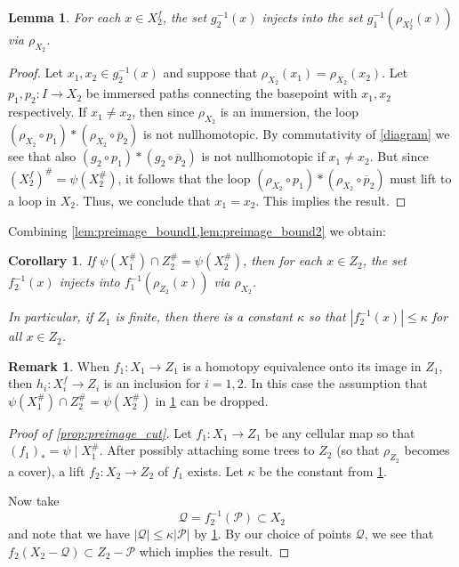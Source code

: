 \documentclass[11pt, a4paper]{amsart}
\newtheorem{lemma}[theorem]{Lemma}
\newtheorem{corollary}[theorem]{Corollary}
\theoremstyle{definition}
\newtheorem{remark}[theorem]{Remark}
\begin{document}
\begin{lemma}
\label{lem:preimage_bound2}
For each $x\in X_2^f$, the set $g_2^{-1}(x)$ injects into the set $g_1^{-1}\left(\rho_{X_2^f}(x)\right)$ via $\rho_{X_2}$.
\end{lemma}

\begin{proof}
Let $x_1, x_2\in g_2^{-1}(x)$ and suppose that $\rho_{X_2}(x_1) = \rho_{X_2}(x_2)$. Let $p_1, p_2\colon I\to X_2$ be immersed paths connecting the basepoint with $x_1, x_2$ respectively. If $x_1 \neq x_2$, then since $\rho_{X_2}$ is an immersion, the loop $(\rho_{X_2}\circ p_1)*(\rho_{X_2}\circ\overline{p}_2)$ is not nullhomotopic. By commutativity of \eqref{diagram} we see that also $(g_2\circ p_1)*(g_2\circ\overline{p}_2)$ is not nullhomotopic if $x_1\neq x_2$. But since $(X_2^f)^{\#} = \psi(X_2^{\#})$, it follows that the loop $(\rho_{X_2}\circ p_1)*(\rho_{X_2}\circ\overline{p}_2)$ must lift to a loop in $X_2$. Thus, we conclude that $x_1 = x_2$. This implies the result.
\end{proof}

Combining \cref{lem:preimage_bound1,lem:preimage_bound2} we obtain:

\begin{corollary}
\label{cor:preimage_bound}
If $\psi(X^{\#}_1)\cap Z^{\#}_2= \psi(X^{\#}_2)$, then for each $x\in Z_2$, the set $f_2^{-1}(x)$ injects into $f_1^{-1}\left(\rho_{Z_2}(x)\right)$ via $\rho_{X_2}$. 

In particular, if $Z_1$ is finite, then there is a constant $\kappa$ so that $|f_2^{-1}(x)|\leqslant \kappa$ for all $x\in Z_2$.
\end{corollary}

\begin{remark}
\label{rem:preimage_remark}
When $f_1\colon X_1\to Z_1$ is a homotopy equivalence onto its image in $Z_1$, then $h_i\colon X_i^f\to Z_i$ is an inclusion for $i = 1, 2$. In this case the assumption that $\psi(X^{\#}_1)\cap Z^{\#}_2= \psi(X^{\#}_2)$ in \cref{cor:preimage_bound} can be dropped.
\end{remark}


\begin{proof}[Proof of \cref{prop:preimage_cut}]
Let $f_1\colon X_1\to Z_1$ be any cellular map so that $(f_1)_* = \psi\mid X_1^{\#}$. After possibly attaching some trees to $Z_2$ (so that $\rho_{Z_2}$ becomes a cover), a lift $f_2\colon X_2\to Z_2$ of $f_1$ exists. Let $\kappa$ be the constant from \cref{cor:preimage_bound}.

Now take 
\[
\mathcal{Q} = f_2^{-1}(\mathcal{P})\subset X_2
\]
and note that we have $|\mathcal{Q}|\leqslant \kappa|\mathcal{P}|$ by \cref{cor:preimage_bound}. By our choice of points $\mathcal{Q}$, we see that $f_2(X_2 - \mathcal{Q})\subset Z_2 - \mathcal{P}$ which implies the result.
\end{proof}
\end{document}
